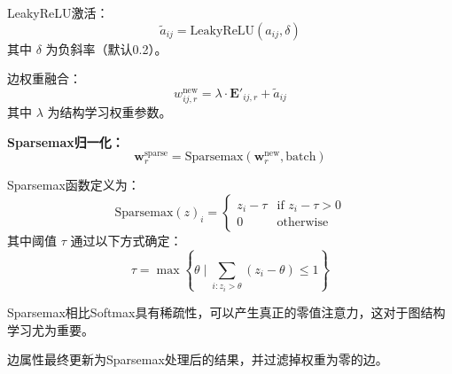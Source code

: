 LeakyReLU激活：
\begin{equation}
\tilde{a}_{ij} = \text{LeakyReLU}(a_{ij}, \delta)
\end{equation}
其中 $\delta$ 为负斜率（默认0.2）。

边权重融合：
\begin{equation}
w_{ij,r}^{\text{new}} = \lambda \cdot \mathbf{E}'_{ij,r} + \tilde{a}_{ij}
\end{equation}
其中 $\lambda$ 为结构学习权重参数。

\textbf{Sparsemax归一化：}
\begin{equation}
\mathbf{w}^{\text{sparse}}_r = \text{Sparsemax}(\mathbf{w}^{\text{new}}_r, \text{batch})
\end{equation}

Sparsemax函数定义为：
\begin{equation}
\text{Sparsemax}(z)_i = \begin{cases}
z_i - \tau & \text{if } z_i - \tau > 0 \\
0 & \text{otherwise}
\end{cases}
\end{equation}
其中阈值 $\tau$ 通过以下方式确定：
\begin{equation}
\tau = \max \left\{ \theta \mid \sum_{i: z_i > \theta} (z_i - \theta) \leq 1 \right\}
\end{equation}

Sparsemax相比Softmax具有稀疏性，可以产生真正的零值注意力，这对于图结构学习尤为重要。

边属性最终更新为Sparsemax处理后的结果，并过滤掉权重为零的边。

